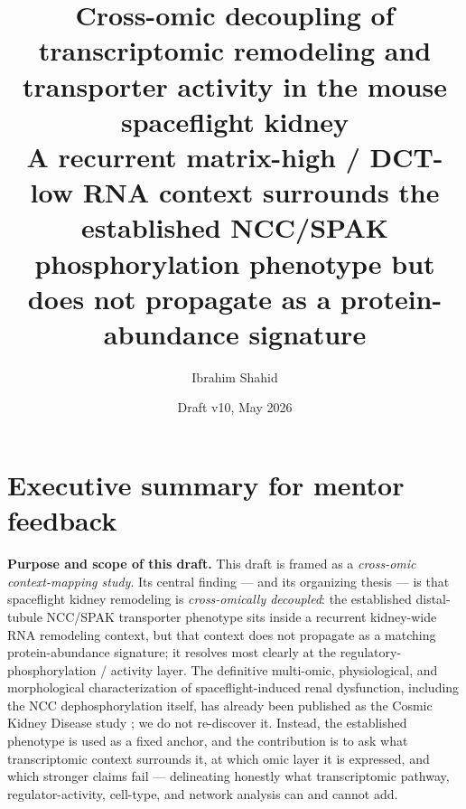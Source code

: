 \documentclass[11pt]{article}
\title{\textbf{Cross-omic decoupling of transcriptomic remodeling and transporter activity in the mouse spaceflight kidney}\\[0.35em]
\large A recurrent matrix-high / DCT-low RNA context surrounds the established NCC/SPAK phosphorylation phenotype but does not propagate as a protein-abundance signature}
\author{Ibrahim Shahid}
\affil{Independent research draft for mentor feedback\\Authorship/collaboration structure pending}
\date{Draft v10, May 2026}
\begin{document}
\maketitle

\section*{Executive summary for mentor feedback}

\noindent\textbf{Purpose and scope of this draft.} This draft is framed as a \emph{cross-omic context-mapping study}. Its central finding --- and its organizing thesis --- is that spaceflight kidney remodeling is \emph{cross-omically decoupled}: the established distal-tubule NCC/SPAK transporter phenotype sits inside a recurrent kidney-wide RNA remodeling context, but that context does not propagate as a matching protein-abundance signature; it resolves most clearly at the regulatory-phosphorylation / activity layer. The definitive multi-omic, physiological, and morphological characterization of spaceflight-induced renal dysfunction, including the NCC dephosphorylation itself, has already been published as the Cosmic Kidney Disease study \citep{siew2024cosmic}; we do not re-discover it. Instead, the established phenotype is used as a fixed anchor, and the contribution is to ask what transcriptomic context surrounds it, at which omic layer it is expressed, and which stronger claims fail --- delineating honestly what transcriptomic pathway, regulator-activity, cell-type, and network analysis can and cannot add.
\end{document}
